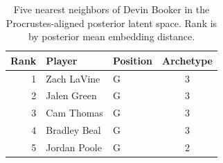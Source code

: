 \begin{table}[htbp]
  \centering\small
  \begin{tabular}{rllc}
    \toprule
    Rank & Player & Position & Archetype \\
    \midrule
    1 & Zach LaVine & G & 3 \\
    2 & Jalen Green & G & 3 \\
    3 & Cam Thomas & G & 3 \\
    4 & Bradley Beal & G & 3 \\
    5 & Jordan Poole & G & 2 \\
    \bottomrule
  \end{tabular}
  \caption{Five nearest neighbors of Devin Booker in the Procrustes-aligned posterior latent space. Rank is by posterior mean embedding distance.}
  \label{tab:Devin_Booker_neighbors}
\end{table}

